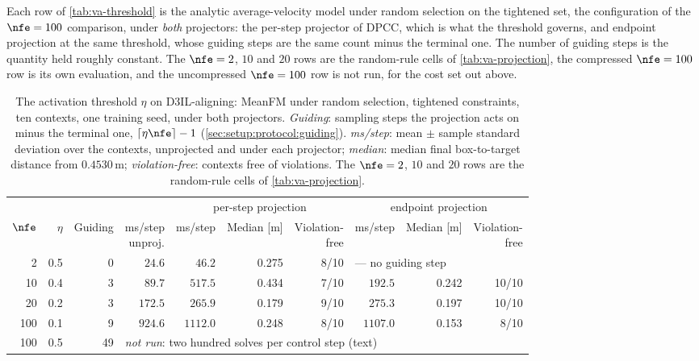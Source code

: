 Each row of \autoref{tab:va-threshold} is the analytic average-velocity model under random selection on
the tightened set, the configuration of the $\nfe=100$ comparison, under \emph{both} projectors: the
per-step projector of \ac{DPCC}, which is what the threshold governs, and endpoint projection at the same
threshold, whose guiding steps are the same count minus the terminal one. The number of guiding steps is
the quantity held roughly constant. The $\nfe=2$, $10$ and $20$ rows are the random-rule cells of
\autoref{tab:va-projection}, the compressed $\nfe=100$ row is its own evaluation, and the uncompressed
$\nfe=100$ row is not run, for the cost set out above.

\begin{table}[htpb]
  \caption[Alignment: the activation threshold across the budget ladder]{The activation threshold
  $\eta$ on D3IL-aligning: MeanFM under random selection, tightened constraints, ten contexts, one
  training seed, under both projectors. \emph{Guiding}: sampling steps the projection acts on minus the
  terminal one, $\lceil \eta\nfe \rceil - 1$ (\autoref{sec:setup:protocol:guiding}). \emph{ms/step}:
  mean $\pm$ sample standard deviation over the contexts, unprojected and under each projector;
  \emph{median}: median final box-to-target distance from $0.4530$\,m; \emph{violation-free}: contexts free of
  violations. The $\nfe=2$, $10$ and $20$ rows are the random-rule cells of \autoref{tab:va-projection}.}
  \label{tab:va-threshold}
  \centering
  \footnotesize
  \setlength{\tabcolsep}{3pt}
  \begin{tabularx}{\linewidth}{@{}r r r r rrr rrr@{}}
    \toprule
    & & & & \multicolumn{3}{c}{per-step projection} & \multicolumn{3}{c}{endpoint projection} \\
    \cmidrule(lr){5-7}\cmidrule(l){8-10}
    $\nfe$ & $\eta$ & Guiding & \shortstack{ms/step\\unproj.} & ms/step & Median [m] & \shortstack{Violation-\\free} & ms/step & Median [m] & \shortstack{Violation-\\free} \\
    \midrule
    2   & 0.5 & 0  & $24.6$  & $46.2$  & 0.275 & 8/10  & \multicolumn{3}{l}{--- no guiding step} \\
    10  & 0.4 & 3  & $89.7$  & $517.5$ & 0.434 & 7/10  & $192.5$ & 0.242 & 10/10 \\
    20  & 0.2 & 3  & $172.5$ & $265.9$ & 0.179 & 9/10  & $275.3$ & 0.197 & 10/10 \\
    100 & 0.1 & 9  & $924.6$ & $1112.0$ & 0.248 & 8/10 & $1107.0$ & 0.153 & 8/10 \\
    100 & 0.5 & 49 & \multicolumn{7}{l}{\emph{not run}: two hundred solves per control step (text)} \\
    \bottomrule
  \end{tabularx}
\end{table}

